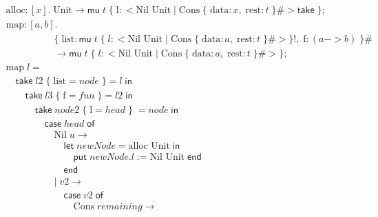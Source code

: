 \begin{figure}
    \centering
    \[
    \begin{array}{l}
\text{alloc} : [x].\; \text{Unit} \rightarrow \textsf{mu}\; t\; \{\; \text{l}: < \text{Nil Unit}\; |\; \text{Cons}\; \{\; \text{data}: x,\; \text{rest}: t\; \}\# > \textsf{take}\; \}; \\[10pt]

\text{map} : [a,b].\; \\
\hspace{5em}
    \{\; \text{list}: \textsf{mu}\; t\; \{\; l: < \text{Nil Unit}\; |\; \text{Cons}\; \{\; \text{data}: a,\; \text{rest}: t\; \}\# > \}!,\; \text{f}: (a -> b)\; \}\# \\
\hspace{5em}
    \rightarrow \textsf{mu}\; t\; \{\; l: < \text{Nil Unit}\; |\; \text{Cons}\; \{\; \text{data}: a,\; \text{rest}: t\; \}\# > \}; \\
\text{map}\; l =  \\
\hspace{1em}
\textsf{take}\; l2\; \{\; \text{list} = node\; \} = l\; \textsf{in} \\
\hspace{2em} 
\textsf{take}\; l3\; \{\; \text{f} = fun\; \} = l2\; \textsf{in} \\
\hspace{3em} 
\textsf{take}\; node2\; \{\; \text{l} = head\; \}\; = node\; \textsf{in} \\
\hspace{4em} 
\textsf{case}\; head\; \textsf{of} \\
\hspace{5em} 
\text{Nil}\; u \rightarrow  \\
\hspace{6em} 
\textsf{let}\; newNode = \text{alloc Unit}\; \textsf{in}  \\
\hspace{7em}
\textsf{put}\; newNode.l := \text{Nil Unit}\; \textsf{end} \\
\hspace{6em} 
\textsf{end} \\
\hspace{5em} 
|\; v2 \rightarrow  \\
\hspace{6em} 
\textsf{case}\; v2\; \textsf{of} \\
\hspace{7em} 
\text{Cons}\; remaining \rightarrow \\
\hspace{8em} 

\end{array}\]
\end{figure}
